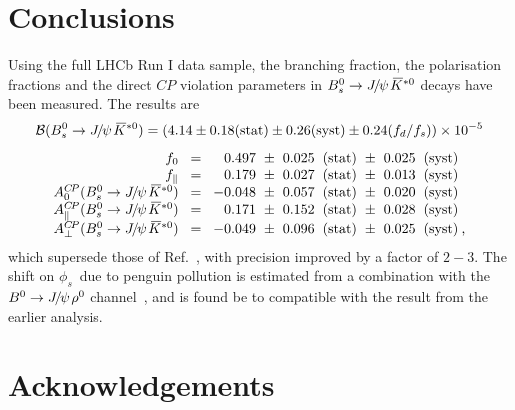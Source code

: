 \documentclass[12pt,a4paper]{article}
\newcommand{\CP}{\ensuremath{{C\!P}}\xspace}
\def\PJ      {\ensuremath{J}\xspace}
\def\lhcb {\mbox{LHCb}\xspace}
\def\CP                {\ensuremath{C\!P}\xspace}
\def\Ppsi {\ensuremath{\psi}\xspace}
\def\jpsi     {{\ensuremath{{\PJ\mskip -3mu/\mskip -2mu\Ppsi\mskip 2mu}}}\xspace}
\newcommand{\Bd}{\ensuremath{B^0}\xspace}
\newcommand{\BsJpsiKst}{\ensuremath{B^0_s\to \jpsi \Kstarzb}\xspace}
\newcommand{\BsJKst}{\BsJpsiKst}
\newcommand{\phis}{\ensuremath{\phi_s}\xspace}
\def\Kbar  {\kern 0.2em\overline{\kern -0.2em K}{}\xspace}
\def\Kstarzb {\ensuremath{\Kbar^{*0}}\xspace}
\newcommand{\BRof}[1]{\ensuremath{{\cal B}(#1)}\xspace}
\newcommand{\BR}{\BRof}
\begin{document}
\section{Conclusions}
\label{sec:conclusion}

Using the full \lhcb Run I data sample, the branching fraction, the polarisation fractions and the direct \CP violation parameters in \BsJKst decays have been measured. 
The results are
\begin{equation*}
\BR{\BsJpsiKst} = \left(4.14 \pm 0.18 \text{(stat)} \pm  0.26 \text{(syst)} \pm 0.24 (f_d/f_s) \right)\times 10^{-5}
\end{equation*}
\[
  \setlength{\arraycolsep}{1mm}
  \begin{array}{rclllllll}
    f_0                  &\;=\; & \phantom{-}0.497 & \pm & 0.025 & \text{(stat)} & \pm & 0.025 & \text{(syst)}  \\
    f_\|                 &\;=\; & \phantom{-}0.179 & \pm & 0.027 & \text{(stat)} & \pm & 0.013 & \text{(syst)}    \\
    A^{\CP}_0(\BsJKst)    &\;=\; & -0.048           & \pm & 0.057 & \text{(stat)} & \pm & 0.020 & \text{(syst)}    \\
    A^{\CP}_\|(\BsJKst)   &\;=\; & \phantom{-}0.171 & \pm & 0.152 & \text{(stat)} & \pm & 0.028 & \text{(syst)}    \\
    A^{\CP}_\perp(\BsJKst) &\;=\; & -0.049           & \pm & 0.096 & \text{(stat)} & \pm & 0.025 & \text{(syst)\:,}    \\
  \end{array}
  \]
which supersede those of Ref.~\cite{LHCb-PAPER-2012-014}, with precision improved by a factor of $2-3$. 
The shift on \phis\ due to penguin pollution is estimated from a combination with the $\Bd\to\jpsi\rho^0$ channel~\cite{LHCb-PAPER-2014-058}, and is found be to compatible with the result from the earlier analysis.

\section*{Acknowledgements}
\end{document}

